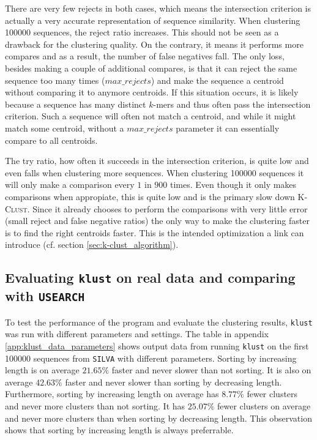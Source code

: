 There are very few rejects in both cases, which means the intersection
criterion is actually a very accurate representation of sequence similarity.
When clustering \num{100000} sequences, the reject ratio increases. This
should not be seen as a drawback for the clustering quality. On the contrary,
it means it performs more compares and as a result, the number of false
negatives fall. The only loss, besides making a couple of additional compares,
is that it can reject the same sequence too many times ($max\_rejects$) and
make the sequence a centroid without comparing it to anymore centroids. If
this situation occurs, it is likely because a sequence has many distinct
$k$-mers and thus often pass the intersection criterion. Such a sequence will
often not match a centroid, and while it might match some centroid, without a
$max\_rejects$ parameter it can essentially compare to all centroids.

The try ratio, how often it succeeds in the intersection criterion, is quite
low and even falls when clustering more sequences. When clustering
\num{100000} sequences it will only make a comparison every $1$ in $900$
times. Even though it only makes comparisons when appropiate, this is quite
low and is the primary slow down \textsc{K-Clust}. Since it already chooses to
perform the comparisons with very little error (small reject and false
negative ratios) the only way to make the clustering faster is to find the
right centroids faster. This is the intended optimization a link can introduce
(cf. section \ref{sec:k-clust_algorithm}).


\subsection{Evaluating \texttt{klust} on real data and comparing with
            \texttt{USEARCH}}
\label{sec:evaluating_klust_real_data}

To test the performance of the program and evaluate the clustering results,
\texttt{klust} was run with different parameters and settings. The table in
appendix \ref{app:klust_data_parameters} shows output data from running
\texttt{klust} on the first \num{100000} sequences from \texttt{SILVA} with
different parameters. Sorting by increasing length is on average $21.65\%$
faster and never slower than not sorting. It is also on average $42.63\%$
faster and never slower than sorting by decreasing length. Furthermore,
sorting by increasing length on average has $8.77\%$ fewer clusters and never
more clusters than not sorting. It has $25.07\%$ fewer clusters on average and
never more clusters than when sorting by decreasing length. This observation
shows that sorting by increasing length is always preferrable.

